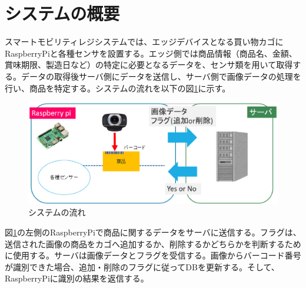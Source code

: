 \section{システムの概要}
スマートモビリティレジシステムでは、エッジデバイスとなる買い物カゴにRaspberryPiと各種センサを設置する。エッジ側では商品情報（商品名、金額、賞味期限、製造日など）の特定に必要となるデータを、センサ類を用いて取得する。データの取得後サーバ側にデータを送信し、サーバ側で画像データの処理を行い、商品を特定する。システムの流れを以下の図\ref{system_summary}に示す。

\begin{figure}[htbp]
\centering
\includegraphics[width=12cm]{./pic/summary.eps}
\caption{システムの流れ}
\label{system_summary}
\end{figure}


図\ref{system_summary}の左側のRaspberryPiで商品に関するデータをサーバに送信する。フラグは、送信された画像の商品をカゴへ追加するか、削除するかどちらかを判断するために使用する。サーバは画像データとフラグを受信する。画像からバーコード番号が識別できた場合、追加・削除のフラグに従ってDBを更新する。そして、RaspberryPiに識別の結果を返信する。

